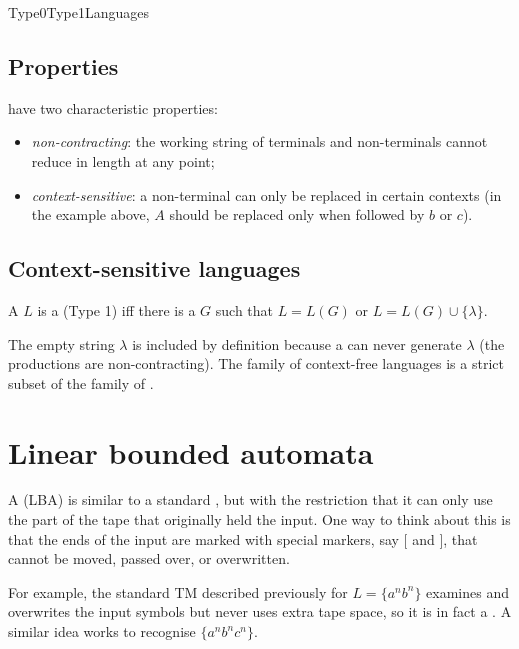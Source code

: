 \documentclass[hidelinks]{article}
\begin{document}
\begin{smodule}[title={Type 0 and Type 1 Languages and their Automata}]{Type0Type1Languages}
\subsection{Properties}

 have two characteristic properties:
\begin{itemize}
  \item \emph{non-contracting}: the working string of terminals and non-terminals cannot reduce in length at any point;
  \item \emph{context-sensitive}: a non-terminal can only be replaced in certain contexts (in the example above, $A$ should be replaced only when followed by $b$ or $c$).
\end{itemize}

\subsection{Context-sensitive languages}

\begin{sdefinition}[for=context-sensitive language]
A  $L$ is a  (Type 1) iff there is a  $G$ such that $L = L(G)$ or $L = L(G) \cup \{\lambda\}$.
\end{sdefinition}

The empty string $\lambda$ is included by definition because a  can never generate $\lambda$ (the productions are non-contracting). The family of context-free languages is a strict subset of the family of .

\section{Linear bounded automata}

\begin{sdefinition}[for=linear-bounded automaton]
A  (LBA) is similar to a standard , but with the restriction that it can only use the part of the tape that originally held the input. One way to think about this is that the ends of the input are marked with special markers, say $[$ and $]$, that cannot be moved, passed over, or overwritten.
\end{sdefinition}

For example, the standard TM described previously for $L = \{a^n b^n\}$ examines and overwrites the input symbols but never uses extra tape space, so it is in fact a . A similar idea works to recognise $\{a^n b^n c^n\}$.


\end{smodule}
\end{document}
